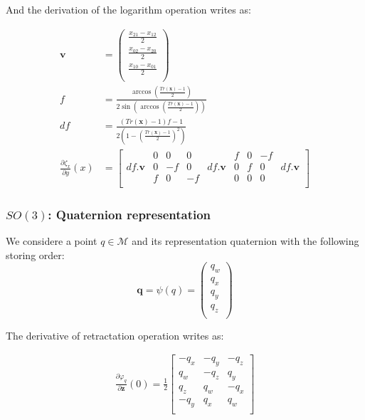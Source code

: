 And the derivation of the logarithm operation writes as:

\begin{align}
\label{eq:diffLogSO3Matrix}
  \mathbf{v} &= \begin{pmatrix}
    \frac{x_{21} - x_{12}}{2}\\
    \frac{x_{02} - x_{20}}{2}\\
    \frac{x_{10} - x_{01}}{2}\\
  \end{pmatrix} \\
  f &= \frac{\arccos \left( \frac{Tr(\mathbf{x})-1}{2} \right)}{2 \sin \left( \arccos \left( \frac{Tr(\mathbf{x})-1}{2} \right) \right) } \\
  df &= \frac{\left(Tr(\mathbf{x})-1\right)f-1}{2 \left( 1- {\left( \frac{Tr(\mathbf{x})-1}{2} \right)}^2 \right)} \\
  \frac{\partial \zeta_x}{\partial y}(x) &= \begin{bmatrix}
      & 0 & 0 & 0 &  & f & 0 & -f &  \\
    df.\mathbf{v} & 0 & -f & 0 & df.\mathbf{v} & 0 & f & 0 & df.\mathbf{v}  \\
      & f & 0 & -f &  & 0 & 0 & 0 &  \\
  \end{bmatrix}
\end{align}

\subsubsection{$SO(3)$: Quaternion representation}
\label{ssub:so3_quaternion_representation}

We considere a point $q\in\mathcal{M}$ and its representation quaternion with the following storing order:
\begin{equation}
\mathbf{q}=\psi(q)
= \begin{pmatrix}
  q_w \\
  q_x \\
  q_y \\
  q_z \\
\end{pmatrix}
\end{equation}

The derivative of retractation operation writes as:

\begin{align}
\label{eq:diffRetrSO3Quat}
  \frac{\partial \varphi_q}{\partial \mathbf{z}}(0) = \frac{1}{2}
  \begin{bmatrix}
    -q_x & -q_y & -q_z \\
     q_w & -q_z &  q_y \\
     q_z &  q_w & -q_x \\
    -q_y &  q_x &  q_w \\
  \end{bmatrix}
\end{align}

